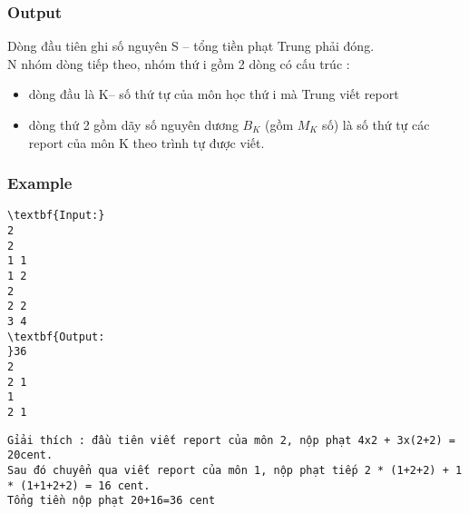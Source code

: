 \subsubsection{Output}

Dòng đầu tiên ghi số nguyên S – tổng tiền phạt Trung phải đóng.
\\N nhóm dòng tiếp theo, nhóm thứ i gồm 2 dòng có cấu trúc :
\begin{itemize}
	\item dòng đầu là K– số thứ tự của môn học thứ i mà Trung viết report
	\item dòng thứ 2 gồm dãy số nguyên dương $B_{K}$ (gồm $M_{K}$ số) là số thứ tự các report của môn K theo trình tự được viết.
\end{itemize}

\subsubsection{Example}
\begin{verbatim}
\textbf{Input:}
2
2
1 1
1 2
2
2 2
3 4
\textbf{Output:
}36
2
2 1
1
2 1\end{verbatim}
\begin{verbatim}
Gỉải thích : đầu tiên viết report của môn 2, nộp phạt 4x2 + 3x(2+2) = 20cent.
Sau đó chuyển qua viết report của môn 1, nộp phạt tiếp 2 * (1+2+2) + 1 * (1+1+2+2) = 16 cent. 
Tổng tiền nộp phạt 20+16=36 cent
\end{verbatim}
